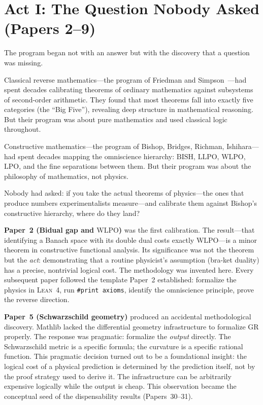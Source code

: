 \documentclass[11pt,a4paper]{report}
\theoremstyle{plain}
\theoremstyle{definition}
\theoremstyle{remark}
\newcommand{\BISH}{\mathrm{BISH}}
\newcommand{\LLPO}{\mathrm{LLPO}}
\newcommand{\WLPO}{\mathrm{WLPO}}
\newcommand{\LPO}{\mathrm{LPO}}
\newcommand{\Lean}{\textsc{Lean~4}}
\begin{document}
\section*{Act I: The Question Nobody Asked (Papers 2--9)}

The program began not with an answer but with the discovery that a question was missing.

Classical reverse mathematics---the program of Friedman and Simpson~\cite{Simpson2009}---had spent decades calibrating theorems of ordinary mathematics against subsystems of second-order arithmetic. They found that most theorems fall into exactly five categories (the ``Big Five''), revealing deep structure in mathematical reasoning. But their program was about pure mathematics and used classical logic throughout.

Constructive mathematics---the program of Bishop, Bridges, Richman, Ishihara---had spent decades mapping the omniscience hierarchy: $\BISH$, $\LLPO$, $\WLPO$, $\LPO$, and the fine separations between them. But their program was about the philosophy of mathematics, not physics.

Nobody had asked: if you take the actual theorems of physics---the ones that produce numbers experimentalists measure---and calibrate them against Bishop's constructive hierarchy, where do they land?

\textbf{Paper~2 (Bidual gap and $\WLPO$)} was the first calibration. The result---that identifying a Banach space with its double dual costs exactly $\WLPO$---is a minor theorem in constructive functional analysis. Its significance was not the theorem but the \emph{act}: demonstrating that a routine physicist's assumption (bra-ket duality) has a precise, nontrivial logical cost. The methodology was invented here. Every subsequent paper followed the template Paper~2 established: formalize the physics in \Lean, run \texttt{\#print axioms}, identify the omniscience principle, prove the reverse direction.

\textbf{Paper~5 (Schwarzschild geometry)} produced an accidental methodological discovery. Mathlib lacked the differential geometry infrastructure to formalize GR properly. The response was pragmatic: formalize the \emph{output} directly. The Schwarzschild metric is a specific formula; the curvature is a specific rational function. This pragmatic decision turned out to be a foundational insight: the logical cost of a physical prediction is determined by the prediction itself, not by the proof strategy used to derive it. The infrastructure can be arbitrarily expensive logically while the output is cheap. This observation became the conceptual seed of the dispensability results (Papers~30--31).
\end{document}
